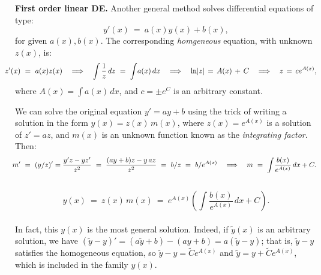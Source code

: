 \documentclass[11pt]{article}
\begin{document}
\newpage

\noindent
{\bf First order linear DE.}
Another general method solves differential equations of type:
$$
y'(x) \ =\ a(x)y(x) + b(x),
$$
for given $a(x),b(x)$.
The corresponding {\it homgeneous} equation, with unknown $z(x)$, is:
$$\hspace{-1.5em}
z'(x)\ =\ a(x)z(x)
\quad\Longrightarrow\quad
\int \frac{1}{z}\,dz \ = \ \int\! a(x)\,dx
\quad\Longrightarrow\quad
\ln\!|z| \,=\, A(x) \,+\, C
\quad\Longrightarrow\quad
z \,=\, ce^{A(x)},
$$
where $A(x) = \int a(x)\,dx$, and $c=\pm e^C$ is an arbitrary constant.

We can solve the original equation $y' = ay+b$ 
using the trick of writing a solution in the form $y(x)=z(x)\,m(x)$,
where $z(x)=e^{A(x)}$ is a solution of $z' = az$,
and $m(x)$ is an unknown function known as  the {\it integrating factor}.
Then:
$$\hspace{-0.5em}
m' \ =\ (y/z)' =
\frac{y' z - y z'}{z^2}
\ =\ \frac{(ay+b)z - y\,az}{z^2}
\ =\ b/z \ =\ b/e^{A(x)}
\quad\Longrightarrow\quad
m \ =\ \int\! \frac{b(x)}{e^{A(x)}}\,dx + C.
$$
\\[-1.4em]
$$
y(x)\ =\ z(x)\,m(x) \ =\ e^{A(x)}\left(\!\int\! \frac{b(x)}{e^{A(x)}}\,dx + C\right).
$$
\\[-0em]
In fact, this $y(x)$ is the most general solution. 
Indeed, if $\tilde y(x)$ is an arbitrary solution, we have
$(\tilde y-y)'= (a\tilde y +b)-(a y+b) = a(\tilde y-y)$;
that is, $\tilde y-y$ satisfies the homogeneous equation,
so $\tilde y-y = \tilde Ce^{A(x)}$ and $\tilde y =y+\tilde Ce^{A(x)}$,
which is included in the family $y(x)$.
\end{document}
